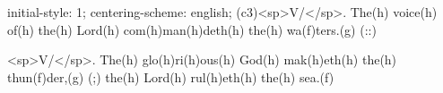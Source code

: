 initial-style: 1;
centering-scheme: english;
(c3)<sp>V/</sp>. The(h) voice(h) of(h) the(h) Lord(h) com(h)man(h)deth(h) the(h) wa(f)ters.(g) (::)

<sp>V/</sp>. The(h) glo(h)ri(h)ous(h) God(h) mak(h)eth(h) the(h) thun(f)der,(g) (;) the(h) Lord(h) rul(h)eth(h) the(h) sea.(f)
